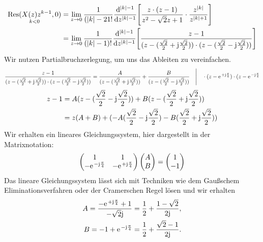 \begin{align}
	\underset{k<0}{\mathrm{Res}(X(z)z^{k-1},0)}&=\lim\limits_{z\rightarrow0}\frac{1}{(|k|-21!}\frac{\mathrm{d}^{|k|-1}}{\mathrm{d}z^{|k|-1}}\Bigg[\frac{z\cdot(z-1)}{z^2-\sqrt{2}z+1}\cdot\frac{z^{|k|}}{z^{|k|+1}}\Bigg ]\nonumber\\
	&=\lim\limits_{z\rightarrow0}\frac{1}{(|k|-1)!}\frac{\mathrm{d}^{|k|-1}}{\mathrm{d}z^{|k|-1}}\Bigg[\frac{z-1}{(z-(\frac{\sqrt{2}}{2}+\im\frac{\sqrt{2}}{2}))\cdot(z-(\frac{\sqrt{2}}{2}-\im\frac{\sqrt{2}}{2}))}\Bigg ]
\end{align}
Wir nutzen Partialbruchzerlegung, um uns das Ableiten zu vereinfachen.
\begin{align}
	\frac{z-1}{(z-(\frac{\sqrt{2}}{2}+\im\frac{\sqrt{2}}{2}))\cdot(z-(\frac{\sqrt{2}}{2}-\im\frac{\sqrt{2}}{2}))}=\frac{A}{(z-(\frac{\sqrt{2}}{2}+\im\frac{\sqrt{2}}{2}))}+\frac{B}{(z-(\frac{\sqrt{2}}{2}-\im\frac{\sqrt{2}}{2}))}\quad\Bigg|\quad\cdot (z-\e^{+\im\frac{\pi}{4}})\cdot(z-\e^{-\im\frac{\pi}{4}} \nonumber
\end{align}
\begin{align}
	z-1&=A(z-(\frac{\sqrt{2}}{2}-\im\frac{\sqrt{2}}{2}))+B(z-(\frac{\sqrt{2}}{2}+\im\frac{\sqrt{2}}{2}))\nonumber \\
	&=z(A+B)+(-A(\frac{\sqrt{2}}{2}-\im\frac{\sqrt{2}}{2})-B(\frac{\sqrt{2}}{2}+\im\frac{\sqrt{2}}{2}))
\end{align}
Wir erhalten ein lineares Gleichungssystem, hier dargestellt in der Matrixnotation:
\begin{align}
	\begin{pmatrix}
		1 & 1 \\
		-\e^{-\im\frac{\pi}{4}} & -\e^{+\im\frac{\pi}{4}} 
	\end{pmatrix}
	\begin{pmatrix}
		A \\
		B 
	\end{pmatrix}
	=
	\begin{pmatrix}
		1 \\
		-1 
	\end{pmatrix}
\end{align}
Das lineare Gleichungssystem lässt sich mit Techniken wie dem Gaußschem Eliminationsverfahren oder der Cramerschen Regel lösen und wir erhalten
\begin{align}
	A=\frac{-\e^{+\im\frac{\pi}{4}}+1}{-\sqrt{2}\im}=\frac{1}{2}+\frac{1-\sqrt{2}}{2\im}, \nonumber\\
	B=-1+\e^{-\im\frac{\pi}{4}}=\frac{1}{2}+\frac{\sqrt{2}-1}{2\im}.
\end{align}
